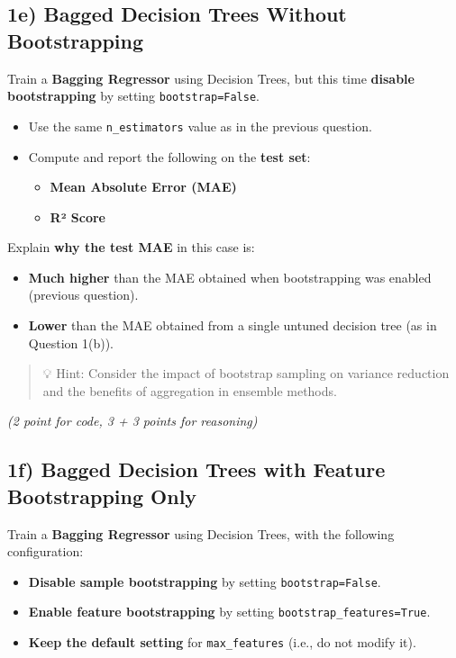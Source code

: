 \documentclass[
  letterpaper,
  DIV=11,
  numbers=noendperiod]{scrreprt}
\providecommand{\tightlist}{%
  \setlength{\itemsep}{0pt}\setlength{\parskip}{0pt}}\usepackage{longtable,booktabs,array}
\begin{document}
\subsection{1e) Bagged Decision Trees Without
Bootstrapping}\label{e-bagged-decision-trees-without-bootstrapping}

Train a \textbf{Bagging Regressor} using Decision Trees, but this time
\textbf{disable bootstrapping} by setting \texttt{bootstrap=False}.

\begin{itemize}
\tightlist
\item
  Use the same \texttt{n\_estimators} value as in the previous question.
\item
  Compute and report the following on the \textbf{test set}:

  \begin{itemize}
  \tightlist
  \item
    \textbf{Mean Absolute Error (MAE)}
  \item
    \textbf{R² Score}
  \end{itemize}
\end{itemize}

Explain \textbf{why the test MAE} in this case is:

\begin{itemize}
\tightlist
\item
  \textbf{Much higher} than the MAE obtained when bootstrapping was
  enabled (previous question).
\item
  \textbf{Lower} than the MAE obtained from a single untuned decision
  tree (as in Question 1(b)).
\end{itemize}

\begin{quote}
💡 Hint: Consider the impact of bootstrap sampling on variance reduction
and the benefits of aggregation in ensemble methods.
\end{quote}

\emph{(2 point for code, 3 + 3 points for reasoning)}

\subsection{1f) Bagged Decision Trees with Feature Bootstrapping
Only}\label{f-bagged-decision-trees-with-feature-bootstrapping-only}

Train a \textbf{Bagging Regressor} using Decision Trees, with the
following configuration:

\begin{itemize}
\tightlist
\item
  \textbf{Disable sample bootstrapping} by setting
  \texttt{bootstrap=False}.\\
\item
  \textbf{Enable feature bootstrapping} by setting
  \texttt{bootstrap\_features=True}.\\
\item
  \textbf{Keep the default setting} for \texttt{max\_features} (i.e., do
  not modify it).
\end{itemize}
\end{document}
